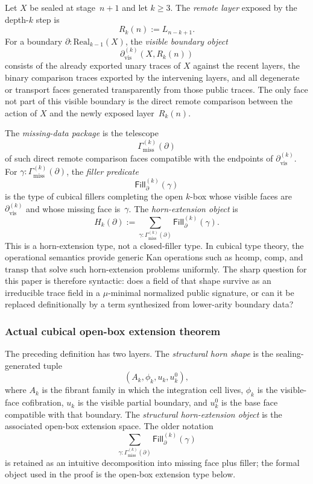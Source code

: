 \documentclass{lmcs}
\newcommand{\Real}{\mathrm{Real}}
\newcommand{\hcomp}{\mathrm{hcomp}}
\newcommand{\compop}{\mathrm{comp}}
\newcommand{\transp}{\mathrm{transp}}
\begin{document}
\begin{defi}
\label{def:horn-extension-package}
Let $X$ be sealed at stage~$n+1$ and let $k\geq3$. The \emph{remote layer} exposed by the depth-$k$ step is
\[
  R_k(n) := L_{n-k+1}.
\]
For a boundary $\partial:\Real_{k-1}(X)$, the \emph{visible boundary object}
\[
  \partial^{(k)}_{\mathrm{vis}}(X,R_k(n))
\]
consists of the already exported unary traces of $X$ against the recent layers, the binary comparison traces exported by the intervening layers, and all degenerate or transport faces generated transparently from those public traces. The only face not part of this visible boundary is the direct remote comparison between the action of $X$ and the newly exposed layer~$R_k(n)$.

The \emph{missing-data package} is the telescope
\[
  \Gamma^{(k)}_{\mathrm{miss}}(\partial)
\]
of such direct remote comparison faces compatible with the endpoints of $\partial^{(k)}_{\mathrm{vis}}$. For $\gamma:\Gamma^{(k)}_{\mathrm{miss}}(\partial)$, the \emph{filler predicate}
\[
  \mathsf{Fill}^{(k)}_{\partial}(\gamma)
\]
is the type of cubical fillers completing the open $k$-box whose visible faces are $\partial^{(k)}_{\mathrm{vis}}$ and whose missing face is~$\gamma$. The \emph{horn-extension object} is
\[
  H_k(\partial)
  :=
  \sum_{\gamma : \Gamma^{(k)}_{\mathrm{miss}}(\partial)}
  \mathsf{Fill}^{(k)}_{\partial}(\gamma).
\]
This is a horn-extension type, not a closed-filler type. In cubical type theory, the operational semantics provide generic Kan operations such as $\hcomp$, $\compop$, and $\transp$ that solve such horn-extension problems uniformly. The sharp question for this paper is therefore syntactic: does a field of that shape survive as an irreducible trace field in a $\mu$-minimal normalized public signature, or can it be replaced definitionally by a term synthesized from lower-arity boundary data?
\end{defi}

\subsubsection{Actual cubical open-box extension theorem}

The preceding definition has two layers. The \emph{structural horn shape} is
the sealing-generated tuple
\[
  (A_k,\phi_k,u_k,u^0_k),
\]
where $A_k$ is the fibrant family in which the integration cell lives,
$\phi_k$ is the visible-face cofibration, $u_k$ is the visible partial
boundary, and $u^0_k$ is the base face compatible with that boundary. The
\emph{structural horn-extension object} is the associated open-box extension
space. The older notation
\[
  \sum_{\gamma:\Gamma^{(k)}_{\mathrm{miss}}(\partial)}
  \mathsf{Fill}^{(k)}_{\partial}(\gamma)
\]
is retained as an intuitive decomposition into missing face plus filler; the
formal object used in the proof is the open-box extension type below.
\end{document}
